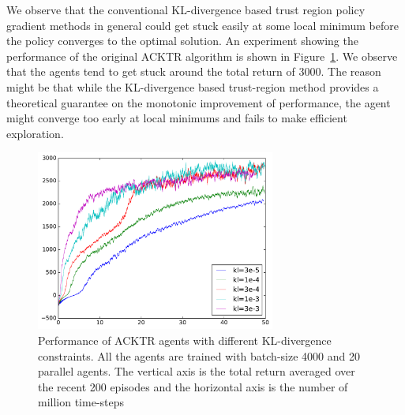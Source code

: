 We observe that the conventional KL-divergence based trust region policy gradient methods in general could get stuck easily at some local minimum before the policy converges to the optimal solution. An experiment showing the performance of the original ACKTR algorithm is shown in Figure~\ref{fig_acktr_mom_tune}. We observe that the agents tend to get stuck around the total return of 3000. The reason might be that while the KL-divergence based trust-region method provides a theoretical guarantee on the monotonic improvement of performance, the agent might converge too early at local minimums and fails to make efficient exploration.
\begin{figure}[!htbp]
	\includegraphics[width=0.7\textwidth]{images/rec_acktr_mom_tune}
	\centering
	\caption{Performance of ACKTR agents with different KL-divergence constraints. All the agents are trained with batch-size 4000 and 20 parallel agents. The vertical axis is the total return averaged over the recent 200 episodes and the horizontal axis is the number of million time-steps}\label{fig_acktr_mom_tune}
\end{figure}

